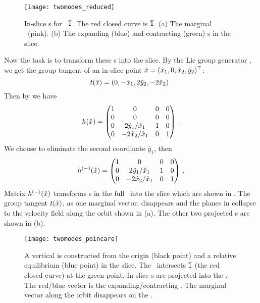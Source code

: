 \begin{figure}[h]
  \centering
  \texttt{[image: twomodes\_reduced]}
  \caption[\Fv s in the slice in the \twomode\ system]{
    In-slice \Fv s for \rpo\ ${\overline{1}}$.
    The red closed curve is ${\overline{1}}$.
    (a) The marginal \Fv\ (pink).
    (b) The expanding (blue) and contracting (green) \Fv s in the slice.
  }
  \label{fig:twomodes_reduced}
\end{figure}

Now the task is to transform these \Fv s into the slice.
By the Lie group generator , we get the
group tangent of an in-slice point
$\hat{x} = {(\hat{x}_1, 0, \hat{x}_2, \hat{y}_2)}{}^\top$:
\[
  t(\hat{x})=(0,-\hat{x}_{1},2\hat{y}_{2},-2\hat{x}_{2})
  \,.
\]
Then by  we have
\[
  h(\hat{x})=
  \begin{pmatrix}
    1 & 0 & 0 & 0 \\
    0 & 0 & 0 & 0 \\
    0 & 2\hat{y}_{1}/\hat{x}_{1} & 1 & 0 \\
    0 & -2\hat{x}_{2}/\hat{x}_{1} & 0 & 1 \\
  \end{pmatrix}
  \,.
\]
We choose to eliminate the second coordinate $\hat{y}_{1}$, then
\[
  h^{(-)}(\hat{x})=
  \begin{pmatrix}
    1 & 0 & 0 & 0 \\
    0 & 2\hat{y}_{1}/\hat{x}_{1} & 1 & 0 \\
    0 & -2\hat{x}_{2}/\hat{x}_{1} & 0 & 1 \\
  \end{pmatrix}
\,.
\]
Matrix $h^{(-)}(\hat{x})$ transforms \Fv s in the full \statesp\ into the
slice which are shown in .
The group tangent $t(\hat{x})$, as one marginal vector,
disappears and the planes in 
collapse to the velocity
field along the orbit shown in (a).
The other two projected \Fv s are shown in
(b).

\begin{figure}[h]
  \centering
  \texttt{[image: twomodes\_poincare]}
  \caption[\Fv s on the {\PoincSec} in the \twomode\ system]{
    A vertical {\PoincSec} is constructed from the origin
    (black point) and a relative equilibrium
    (blue point) in
    the slice.
    The \PoincSec\ intersects ${\overline{1}}$ (the red closed curve)
    at the green point.
    In-slice \Fv s are projected into the
    {\PoincSec}. The red/blue vector is the expanding/contracting
    \Fv. The marginal vector along the orbit disappears on the {\PoincSec}.
  }
  \label{fig:twomodes_poincare}
\end{figure}

